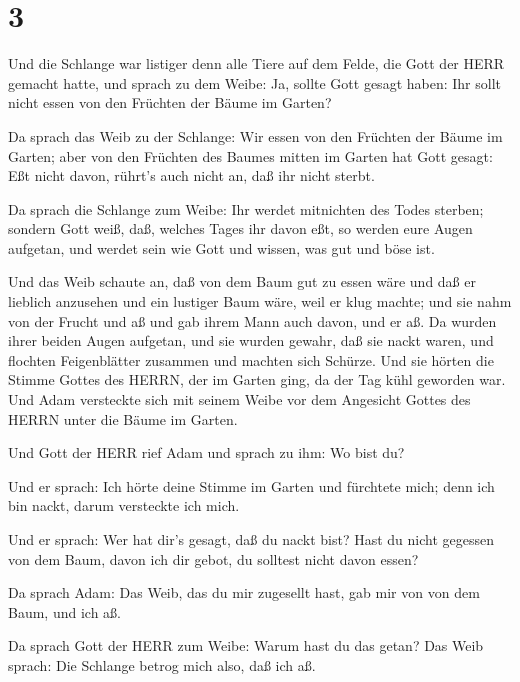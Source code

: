 \hypertarget{section-2}{%
\section{3}\label{section-2}}

 Und die Schlange war listiger denn alle Tiere auf dem
Felde, die Gott der HERR gemacht hatte, und sprach zu dem Weibe: Ja,
sollte Gott gesagt haben: Ihr sollt nicht essen von den Früchten der
Bäume im Garten?

 Da sprach das Weib zu der Schlange: Wir essen von den
Früchten der Bäume im Garten;  aber von den Früchten des
Baumes mitten im Garten hat Gott gesagt: Eßt nicht davon, rührt's auch
nicht an, daß ihr nicht sterbt.

 Da sprach die Schlange zum Weibe: Ihr werdet mitnichten des
Todes sterben;  sondern Gott weiß, daß, welches Tages ihr
davon eßt, so werden eure Augen aufgetan, und werdet sein wie Gott und
wissen, was gut und böse ist.

 Und das Weib schaute an, daß von dem Baum gut zu essen wäre
und daß er lieblich anzusehen und ein lustiger Baum wäre, weil er klug
machte; und sie nahm von der Frucht und aß und gab ihrem Mann auch
davon, und er aß.  Da wurden ihrer beiden Augen aufgetan,
und sie wurden gewahr, daß sie nackt waren, und flochten Feigenblätter
zusammen und machten sich Schürze.  Und sie hörten die
Stimme Gottes des HERRN, der im Garten ging, da der Tag kühl geworden
war. Und Adam versteckte sich mit seinem Weibe vor dem Angesicht Gottes
des HERRN unter die Bäume im Garten.

 Und Gott der HERR rief Adam und sprach zu ihm: Wo bist du?

 Und er sprach: Ich hörte deine Stimme im Garten und
fürchtete mich; denn ich bin nackt, darum versteckte ich mich.

 Und er sprach: Wer hat dir's gesagt, daß du nackt bist?
Hast du nicht gegessen von dem Baum, davon ich dir gebot, du solltest
nicht davon essen?

 Da sprach Adam: Das Weib, das du mir zugesellt hast, gab
mir von von dem Baum, und ich aß.

 Da sprach Gott der HERR zum Weibe: Warum hast du das
getan? Das Weib sprach: Die Schlange betrog mich also, daß ich aß.

